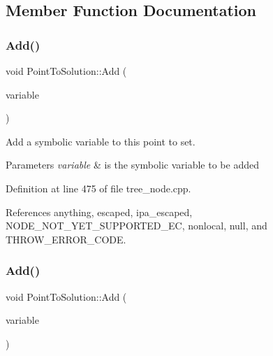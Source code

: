 \subsection{Member Function Documentation}
\mbox{\label{structPointToSolution_a1ac5afb047b8a7d6f94c1ec28a99ba5d}} 
\subsubsection{\texorpdfstring{Add()}{Add()}\hspace{0.1cm}{\footnotesize\ttfamily [1/2]}}
{\footnotesize\ttfamily void Point\+To\+Solution\+::\+Add (\begin{DoxyParamCaption}\item[{const std\+::string \&}]{variable }\end{DoxyParamCaption})}



Add a symbolic variable to this point to set. 


\begin{DoxyParams}{Parameters}
{\em variable} & is the symbolic variable to be added \\
\hline
\end{DoxyParams}


Definition at line 475 of file tree\+\_\+node.\+cpp.



References anything, escaped, ipa\+\_\+escaped, N\+O\+D\+E\+\_\+\+N\+O\+T\+\_\+\+Y\+E\+T\+\_\+\+S\+U\+P\+P\+O\+R\+T\+E\+D\+\_\+\+EC, nonlocal, null, and T\+H\+R\+O\+W\+\_\+\+E\+R\+R\+O\+R\+\_\+\+C\+O\+DE.

\mbox{\label{structPointToSolution_ae6f6414be5312f645fb4cc3dace51a41}} 
\subsubsection{\texorpdfstring{Add()}{Add()}\hspace{0.1cm}{\footnotesize\ttfamily [2/2]}}
{\footnotesize\ttfamily void Point\+To\+Solution\+::\+Add (\begin{DoxyParamCaption}\item[{const \hyperlink{tree__node_8hpp_a6ee377554d1c4871ad66a337eaa67fd5}{tree\+\_\+node\+Ref} \&}]{variable }\end{DoxyParamCaption})}



